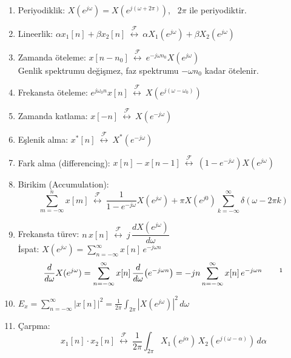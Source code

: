 \documentclass[11pt,a4paper]{article}
\begin{document}
\begin{enumerate}[label=\arabic*), leftmargin=2.2em, itemsep=5pt]
  \item Periyodiklik: $X(e^{j\omega})=X(e^{j(\omega+2\pi)})$, \ $2\pi$ ile periyodiktir.
  \item Lineerlik: $\alpha x_1[n]+\beta x_2[n]\ \overset{\mathcal{F}}{\longleftrightarrow}\ \alpha X_1(e^{j\omega})+\beta X_2(e^{j\omega})$
  \item Zamanda öteleme: $x[n-n_0]\ \overset{\mathcal{F}}{\longleftrightarrow}\ e^{-j\omega n_0}X(e^{j\omega})$\\
    Genlik spektrumu değişmez, faz spektrumu $-\omega n_0$ kadar ötelenir.
  \item Frekansta öteleme: $e^{j\omega_0 n}x[n]\ \overset{\mathcal{F}}{\longleftrightarrow}\ X(e^{j(\omega-\omega_0)})$
  \item Zamanda katlama: $x[-n]\ \overset{\mathcal{F}}{\longleftrightarrow}\ X(e^{-j\omega})$
  \item Eşlenik alma: $x^{*}[n]\ \overset{\mathcal{F}}{\longleftrightarrow}\ X^{*}(e^{-j\omega})$
  \item Fark alma (differencing): $x[n]-x[n-1]\ \overset{\mathcal{F}}{\longleftrightarrow}\ (1-e^{-j\omega})X(e^{j\omega})$
  \item Birikim (Accumulation):
    \[ \sum_{m=-\infty}^{n}x[m]\ \overset{\mathcal{F}}{\longleftrightarrow}\ \frac{1}{1-e^{-j\omega}}X(e^{j\omega})+\pi X(e^{j0})\sum_{k=-\infty}^{\infty}\delta(\omega-2\pi k) \]
  \item Frekansta türev: $n\,x[n]\ \overset{\mathcal{F}}{\longleftrightarrow}\ j\,\dfrac{dX(e^{j\omega})}{d\omega}$\\
    İspat: $X(e^{j\omega})=\displaystyle\sum_{n=-\infty}^{\infty}x[n]\,e^{-j\omega n}$
    \[ \frac{d}{d\omega}X(e^{j\omega})=\sum_{n=-\infty}^{\infty}x[n]\,\frac{d}{d\omega}\big(e^{-j\omega n}\big)=-jn\sum_{n=-\infty}^{\infty}x[n]\,e^{-j\omega n}\qquad\text{\footnotemark} \]
  \item {} $E_x=\displaystyle\sum_{n=-\infty}^{\infty}|x[n]|^2=\frac{1}{2\pi}\int_{2\pi}|X(e^{j\omega})|^2\,d\omega$
  \item Çarpma:
    \[ x_1[n]\cdot x_2[n]\ \overset{\mathcal{F}}{\longleftrightarrow}\ \frac{1}{2\pi}\int_{2\pi}X_1(e^{j\alpha})\,X_2(e^{j(\omega-\alpha)})\,d\alpha \]
\end{enumerate}
\end{document}
